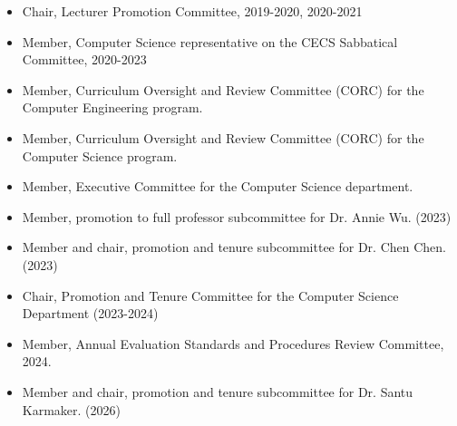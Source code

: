 \begin{itemize}
\item Chair, Lecturer Promotion Committee, 2019-2020, 2020-2021

\item Member, Computer Science representative on the CECS Sabbatical Committee, 2020-2023

\item Member, Curriculum Oversight and Review Committee (CORC) for the Computer Engineering program.

\item Member, Curriculum Oversight and Review Committee (CORC) for the Computer Science program.

\item Member, Executive Committee for the Computer Science department.

\item Member, promotion to full professor subcommittee for Dr. Annie Wu. (2023)

\item Member and chair, promotion and tenure subcommittee for Dr. Chen Chen. (2023)

\item Chair, Promotion and Tenure Committee for the Computer Science Department (2023-2024)

\item Member, Annual Evaluation Standards and Procedures Review Committee, 2024. 

\item Member and chair, promotion and tenure subcommittee for Dr. Santu Karmaker. (2026)

\end{itemize}

